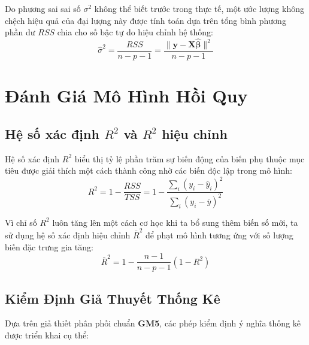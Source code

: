 \documentclass[12pt,a4paper]{report}
\begin{document}
Do phương sai sai số $\sigma^2$ không thể biết trước trong thực tế, một ước lượng không chệch hiệu quả của đại lượng này được tính toán dựa trên tổng bình phương phần dư $RSS$ chia cho số bậc tự do hiệu chỉnh hệ thống:
\begin{equation}
    \hat{\sigma}^2 = \frac{RSS}{n - p - 1} = \frac{\|\mathbf{y} - \mathbf{X}\hat{\boldsymbol{\beta}}\|^2}{n - p - 1}
\end{equation}

\section{Đánh Giá Mô Hình Hồi Quy}

\subsection{Hệ số xác định $R^2$ và $R^2$ hiệu chỉnh}

Hệ số xác định $R^2$ biểu thị tỷ lệ phần trăm sự biến động của biến phụ thuộc mục tiêu được giải thích một cách thành công nhờ các biến độc lập trong mô hình:
\begin{equation}
    R^2 = 1 - \frac{RSS}{TSS} = 1 - \frac{\sum_{i}(y_i - \hat{y}_i)^2}{\sum_{i}(y_i - \bar{y})^2}
\end{equation}

Vì chỉ số $R^2$ luôn tăng lên một cách cơ học khi ta bổ sung thêm biến số mới, ta sử dụng hệ số xác định hiệu chỉnh $\bar{R}^2$ để phạt mô hình tương ứng với số lượng biến đặc trưng gia tăng:
\begin{equation}
    \bar{R}^2 = 1 - \frac{n - 1}{n - p - 1}(1 - R^2)
\end{equation}

\subsection{Kiểm Định Giả Thuyết Thống Kê}

Dựa trên giả thiết phân phối chuẩn \textbf{GM5}, các phép kiểm định ý nghĩa thống kê được triển khai cụ thể:
\end{document}
